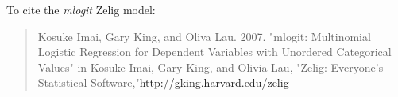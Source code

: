To cite the \emph{ mlogit } Zelig model:
 \begin{verse}
 Kosuke Imai, Gary King, and Oliva Lau. 2007. "mlogit: Multinomial Logistic Regression for Dependent Variables with Unordered Categorical Values" in Kosuke Imai, Gary King, and Olivia Lau, "Zelig: Everyone's Statistical Software,"\url{http://gking.harvard.edu/zelig} 
\end{verse}